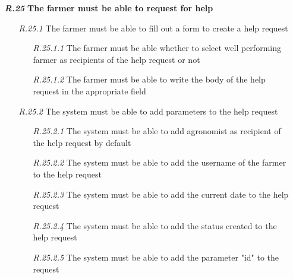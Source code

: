\begin{itemize}
        \item [\textbf{\textit{R.25}}]\textbf{ The farmer must be able to request for help }
        \begin{itemize}
            \item [\textit{R.25.1}] The farmer must be able to fill out a form to create a help request
            \begin{itemize}
                \item [\textit{R.25.1.1}] The farmer must be able whether to select well performing farmer as recipients of the help request or not
		        \item [\textit{R.25.1.2}] The farmer must be able to write the body of the help request in the appropriate field
            \end{itemize}
            \item [\textit{R.25.2}] The system must be able to add parameters to the help request
            \begin{itemize}
                \item [\textit{R.25.2.1}] The system must be able to add agronomist as recipient of the help request by default
		        \item [\textit{R.25.2.2}] The system must be able to add the username of the farmer to the help request
		        \item [\textit{R.25.2.3}] The system must be able to add the current date to the help request
		        \item [\textit{R.25.2.4}] The system must be able to add the status created to the help request
		        \item [\textit{R.25.2.5}] The system must be able to add the parameter "id" to the request

            \end{itemize}
        \end{itemize}
        	

\end{itemize}
